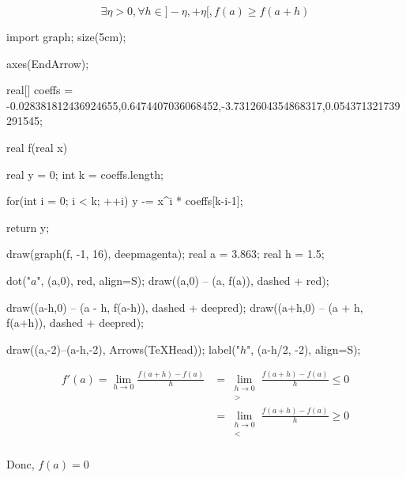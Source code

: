 \begin{prv}
	\[
		\exists \eta > 0, \forall h \in ]-\eta, +\eta[, f(a) \ge f(a + h)
	\]

	\begin{center}
		\begin{asy}
			import graph;
			size(5cm);

			axes(EndArrow);

			real[] coeffs = {-0.028381812436924655,0.6474407036068452,-3.7312604354868317,0.054371321739291545};

			real f(real x) {
				real y = 0;
				int k = coeffs.length;

				for(int i = 0; i < k; ++i) {
					y -= x^i * coeffs[k-i-1];
				}

				return y;
			}

			draw(graph(f, -1, 16), deepmagenta);
			real a = 3.863;
			real h = 1.5;

			dot("$a$", (a,0), red, align=S);
			draw((a,0) -- (a, f(a)), dashed + red);

			draw((a-h,0) -- (a - h, f(a-h)), dashed + deepred);
			draw((a+h,0) -- (a + h, f(a+h)), dashed + deepred);

			draw((a,-2)--(a-h,-2), Arrows(TeXHead));
			label("$h$", (a-h/2, -2), align=S);
		\end{asy}
	\end{center}


	\begin{align*}
		f'(a) = \lim_{h\to 0} \frac{f(a+h)-f(a)}{h} &= \lim_{\substack{h\to 0\\>}} \frac{f(a+h)-f(a)}{h} \le 0 \\
		&= \lim_{\substack{h\to 0\\<}} \frac{f(a + h) - f(a)}{h} \ge 0 \\
	\end{align*}

	Donc, $f(a) = 0$
\end{prv}

